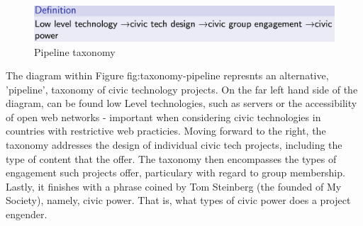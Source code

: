 \begin{figure}[h]
	\centering
	\includegraphics[scale=0.3]{images/taxonomy-pipeline}
	\caption{Pipeline taxonomy}
	\label{fig:taxonomy-pipeline}
\end{figure}

The diagram within Figure {fig:taxonomy-pipeline} represnts an alternative, 'pipeline', taxonomy of civic technology projects.
On the far left hand side of the diagram, can be found low Level technologies, such as servers or the accessibility of open web networks - important when considering civic technologies in countries with restrictive web practicies.
Moving forward to the right, the taxonomy addresses the design of individual civic tech projects, including the type of content that the offer.	
The taxonomy then encompasses the types of engagement such projects offer, particulary with regard to group membership.
Lastly, it finishes with a phrase coined by Tom Steinberg (the founded of My Society), namely, civic power. 
That is, what types of civic power does a project engender.
  